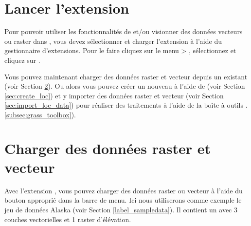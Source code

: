 \section{Lancer l'extension \grass}\label{sec:starting_grass}

Pour pouvoir utiliser les fonctionnalités de \grass et/ou visionner des données vecteurs ou raster dans \qg, 
vous devez sélectionner et charger l'extension \grass à l'aide du gestionnaire d'extensions. 
Pour le faire cliquez sur le menu  > , 
sélectionnez \dropmenuopt{\grass} et cliquez sur .

Vous pouvez maintenant charger des données raster et vecteur depuis un  \grass existant (voir Section \ref{sec:load_grassdata}). Ou alors vous pouvez créer un nouveau  \grass à l'aide de \qg (voir Section \ref{sec:create_loc}) et y importer des données raster et vecteur (voir Section \ref{sec:import_loc_data}) pour réaliser des traitements à l'aide de la boîte à outils \grass.\ref{subsec:grass_toolbox}).

\section{Charger des données \grass raster et vecteur}\label{sec:load_grassdata}

Avec l'extension \grass, vous pouvez charger des données raster ou vecteur à l'aide du bouton approprié dans la barre de menu. Ici nous utiliserons comme exemple le jeu de données \qg Alaska (voir Section \ref{label_sampledata}). Il contient un  \grass avec 3 couches vectorielles et 1 raster d'élévation.

